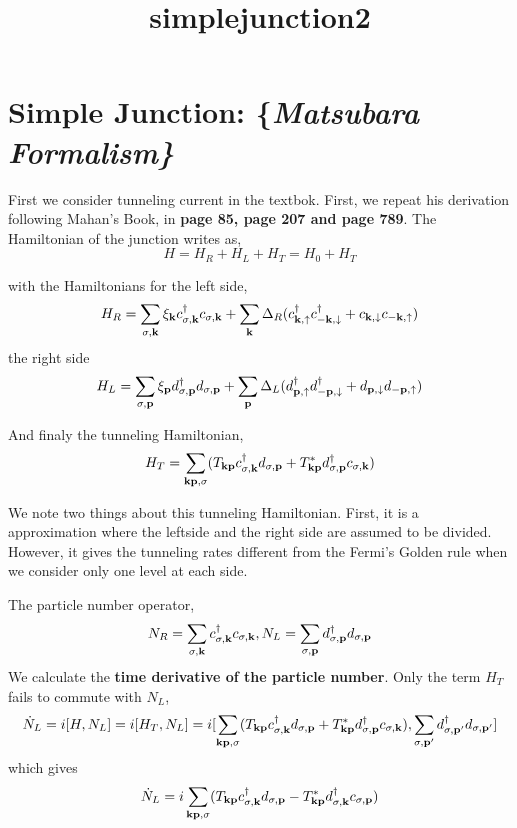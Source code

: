 \documentclass[11pt]{article}
\title{simplejunction2}
\begin{document}
    
    
    \maketitle
    
    

    
    \hypertarget{simple-junction}{%
\section{\texorpdfstring{Simple Junction:
\{\it Matsubara Formalism\}}{Simple Junction: \{\}}}\label{simple-junction}}

    First we consider tunneling current in the textbok. First, we repeat his
derivation following Mahan's Book, in \textbf{page 85, page 207 and page
789}. The Hamiltonian of the junction writes as, \[
H=H_{R}+H_L+H_T=H_0+H_T
\]

    with the Hamiltonians for the left side, \[
H_R =\sum_{\sigma,{\bf k}} \xi_{\bf k} c^{\dagger}_{\sigma,{\bf
k}}c_{\sigma,{\bf k}}+\sum_{{\bf k}} \Delta_R ( c^{\dagger}_{{\bf
k},\uparrow}c^{\dagger}_{{\bf -k},\downarrow}+ c_{{\bf
k},\downarrow} c_{{\bf -k},\uparrow})
\] the right side \[
H_L=\sum_{\sigma,{\bf p}}\xi_{\bf p} d^{\dagger}_{\sigma,{\bf
p}}d_{\sigma,{\bf p}}+\sum_{{\bf p}}
\Delta_L (d^{\dagger}_{{\bf p},\uparrow}d^{\dagger}_{{\bf -p},\downarrow} + d_{{\bf p},\downarrow}d_{{\bf -p},\uparrow})
\]

    And finaly the tunneling Hamiltonian, \[
H_T=\sum_{{\bf k}{\bf p},\sigma}(T_{{\bf k}{\bf
p}}c^{\dagger}_{\sigma,{\bf k}}d_{\sigma,{\bf p}}+T^*_{{\bf k}{\bf
p}}d^{\dagger}_{\sigma,{\bf p}}c_{\sigma,{\bf k}})
\]

We note two things about this tunneling Hamiltonian. First, it is a
approximation where the leftside and the right side are assumed to be
divided. However, it gives the tunneling rates different from the
Fermi's Golden rule when we consider only one level at each side.

    The particle number operator, \[
N_R=\sum_{\sigma,{\bf k}}
c^{\dagger}_{\sigma,{\bf k}}c_{\sigma,{\bf k}},
N_L=\sum_{\sigma,{\bf p}} d^{\dagger}_{\sigma,{\bf p}}d_{\sigma,{\bf
p}}
\] We calculate the \textbf{time derivative of the particle number}.
Only the term \(H_T\) fails to commute with \(N_L\), \[
\dot N_L=i[H,N_L]=i[H_T,N_L] 
=i[\sum_{{\bf k}{\bf p},\sigma}(T_{{\bf
k}{\bf p}}c^{\dagger}_{\sigma,{\bf k}}d_{\sigma,{\bf p}}+T^*_{{\bf
k}{\bf p}}d^{\dagger}_{\sigma,{\bf p}}c_{\sigma,{\bf
k}}),\sum_{\sigma,{\bf p'}} d^{\dagger}_{\sigma,{\bf
p'}}d_{\sigma,{\bf p'}}]
\] which gives \[
\dot N_L= i\sum_{{\bf k}{\bf p},\sigma}(T_{{\bf
k}{\bf p}}c^{\dagger}_{\sigma,{\bf k}}d_{\sigma,{\bf p}}-T^*_{{\bf
k}{\bf p}}d^{\dagger}_{\sigma,{\bf k}}c_{\sigma,{\bf p}})
\]
\end{document}
